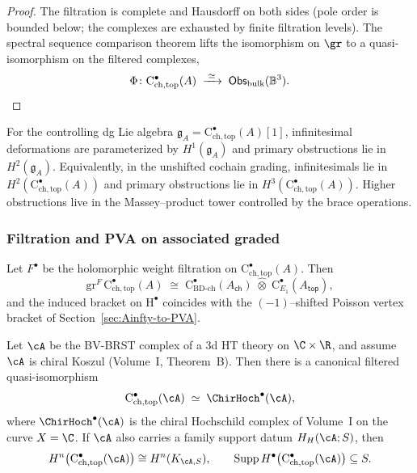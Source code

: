 \begin{proof}
The filtration is complete and Hausdorff on both sides (pole order is bounded below; the complexes are exhausted by finite filtration levels). The spectral sequence comparison theorem lifts the isomorphism on $\gr$ to a quasi-isomorphism on the filtered complexes,
\[
\Phi \colon \mathrm{C}^\bullet_{\mathrm{ch,top}}(A) \;\xrightarrow{\;\simeq\;}\; \mathsf{Obs}_{\mathrm{bulk}}(\mathbb{B}^3). \qedhere
\]
\end{proof}

\begin{corollary}
\label{cor:obstructions}
For the controlling dg Lie algebra
$\mathfrak g_A=\mathrm{C}^\bullet_{\mathrm{ch,top}}(A)[1]$,
infinitesimal deformations are parameterized by
$H^1(\mathfrak g_A)$ and primary obstructions lie in
$H^2(\mathfrak g_A)$. Equivalently, in the unshifted cochain grading,
infinitesimals lie in
$H^2(\mathrm{C}^\bullet_{\mathrm{ch,top}}(A))$ and primary
obstructions lie in
$H^3(\mathrm{C}^\bullet_{\mathrm{ch,top}}(A))$. Higher obstructions
live in the Massey--product tower controlled by the brace operations.
\end{corollary}

\subsubsection{Filtration and PVA on associated graded}
\label{subsec:filtration-PVA}
Let $F^\bullet$ be the holomorphic weight filtration on $\mathrm{C}^\bullet_{\mathrm{ch,top}}(A)$. Then
\[
\mathrm{gr}^F\, \mathrm{C}^\bullet_{\mathrm{ch,top}}(A)
\;\cong\;
\mathrm{C}^\bullet_{\mathrm{BD\text{-}ch}}(A_{\mathsf{ch}})\;\widehat\otimes\; \mathrm{C}^\bullet_{E_1}(A_{\mathsf{top}}),
\]
and the induced bracket on $\mathrm{H}^\bullet$ coincides with the $(-1)$--shifted Poisson vertex bracket of Section~\ref{sec:Ainfty-to-PVA}.

\begin{theorem}
\label{thm:hochschild-bridge-genus0}
Let $\cA$ be the BV-BRST complex of a
3d HT theory on $\C \times \R$, and assume $\cA$ is chiral Koszul
(Volume~I, Theorem~B). Then there is a canonical filtered
quasi-isomorphism
\[
\mathrm{C}^\bullet_{\mathrm{ch,top}}(\cA)
\;\simeq\;
\ChirHoch^\bullet(\cA),
\]
where $\ChirHoch^\bullet(\cA)$ is the chiral Hochschild complex of
Volume~I on the curve $X = \C$.  If $\cA$ also carries a family
support datum $H_H(\cA;S)$, then
\[
 H^n\!\left(\mathrm C^\bullet_{\mathrm{ch,top}}(\cA)\right)
 \cong H^n(K_{\cA,S}),
 \qquad
 \operatorname{Supp}H^\bullet
 \!\left(\mathrm C^\bullet_{\mathrm{ch,top}}(\cA)\right)
 \subseteq S.
\]
\end{theorem}

